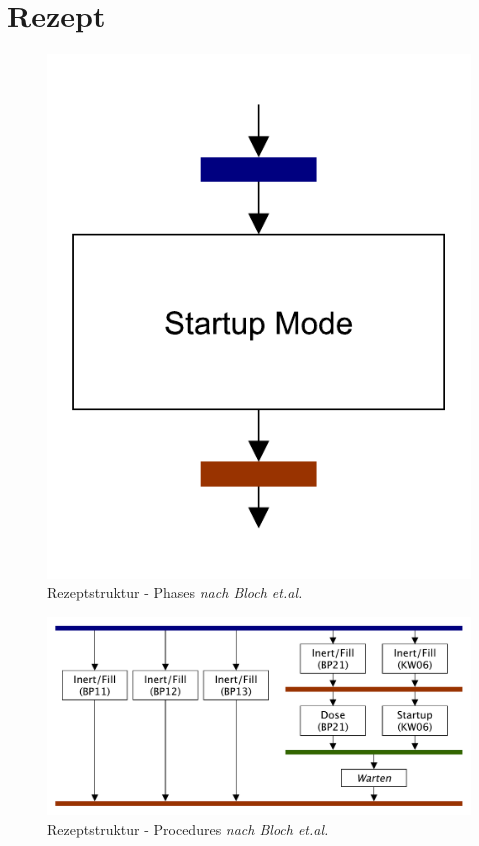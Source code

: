 \section{Rezept}
\label{A:Rezept}
\begin{figure}[h!]
\centering
\includegraphics[scale=0.29]{DA_files/Bilder/Anhang/Phases.pdf}
\caption[Rezeptstruktur modulare Anlage - Phases \textit{nach Bloch et.al.}]{Rezeptstruktur - Phases \textit{nach Bloch et.al.} \citep[53]{Bloch2017}}
\end{figure}

\begin{figure}[h!]
\centering
\includegraphics[scale=0.29]{DA_files/Bilder/Anhang/Procedures.pdf}
\caption[Rezeptstruktur modulare Anlage - Procedures \textit{nach Bloch et.al.}]{Rezeptstruktur - Procedures \textit{nach Bloch et.al.} \citep[53]{Bloch2017}}
\end{figure}

